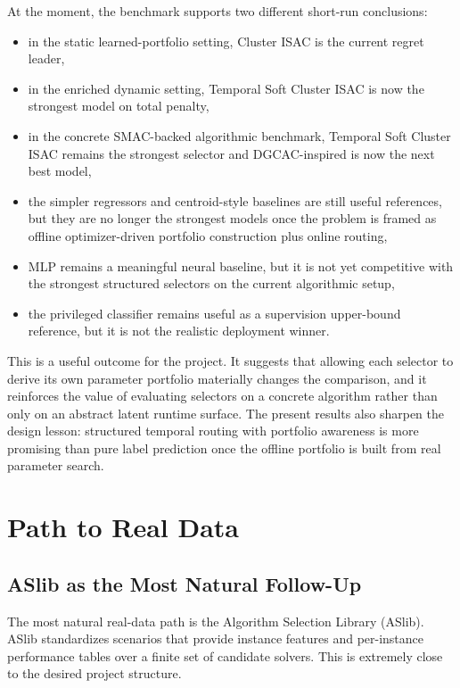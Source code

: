 \documentclass[11pt]{report}
\begin{document}
At the moment, the benchmark supports two different short-run conclusions:
\begin{itemize}[leftmargin=2em]
\item in the static learned-portfolio setting, Cluster ISAC is the current regret leader,
\item in the enriched dynamic setting, Temporal Soft Cluster ISAC is now the strongest model on total penalty,
\item in the concrete SMAC-backed algorithmic benchmark, Temporal Soft Cluster ISAC remains the strongest selector and DGCAC-inspired is now the next best model,
\item the simpler regressors and centroid-style baselines are still useful references, but they are no longer the strongest models once the problem is framed as offline optimizer-driven portfolio construction plus online routing,
\item MLP remains a meaningful neural baseline, but it is not yet competitive with the strongest structured selectors on the current algorithmic setup,
\item the privileged classifier remains useful as a supervision upper-bound reference, but it is not the realistic deployment winner.
\end{itemize}

This is a useful outcome for the project. It suggests that allowing each selector to derive its own parameter portfolio materially changes the comparison, and it reinforces the value of evaluating selectors on a concrete algorithm rather than only on an abstract latent runtime surface. The present results also sharpen the design lesson: structured temporal routing with portfolio awareness is more promising than pure label prediction once the offline portfolio is built from real parameter search.

\chapter{Path to Real Data}

\section{ASlib as the Most Natural Follow-Up}

The most natural real-data path is the Algorithm Selection Library (ASlib). ASlib standardizes scenarios that provide instance features and per-instance performance tables over a finite set of candidate solvers. This is extremely close to the desired project structure.
\end{document}

